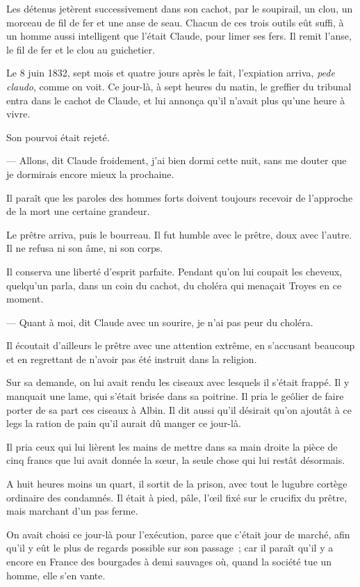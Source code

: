 \documentclass[french,twoside]{book} %
\begin{document}
Les détenus jetèrent successivement dans son cachot, par le soupirail, un clou, un morceau de fil de fer et une anse de seau. Chacun de ces trois outils eût suffi, à un homme aussi intelligent que l’était Claude, pour limer ses fers. Il remit l’anse, le fil de fer et le clou au guichetier.\par
Le 8 juin 1832, sept mois et quatre jours après le fait, l’expiation arriva, \emph{pede claudo}, comme on voit. Ce jour-là, à sept heures du matin, le greffier du tribunal entra dans le cachot de Claude, et lui annonça qu’il n’avait plus qu’une heure à vivre.\par
Son pourvoi était rejeté.\par
— Allons, dit Claude froidement, j’ai bien dormi cette nuit, sans me douter que je dormirais encore mieux la prochaine.\par
Il paraît que les paroles des hommes forts doivent  toujours recevoir de l’approche de la mort une certaine grandeur.\par
Le prêtre arriva, puis le bourreau. Il fut humble avec le prêtre, doux avec l’autre. Il ne refusa ni son âme, ni son corps.\par
Il conserva une liberté d’esprit parfaite. Pendant qu’on lui coupait les cheveux, quelqu’un parla, dans un coin du cachot, du choléra qui menaçait Troyes en ce moment.\par
— Quant à moi, dit Claude avec un sourire, je n’ai pas peur du choléra.\par
Il écoutait d’ailleurs le prêtre avec une attention extrême, en s’accusant beaucoup et en regrettant de n’avoir pas été instruit dans la religion.\par
Sur sa demande, on lui avait rendu les ciseaux avec lesquels il s’était frappé. Il y manquait une lame, qui s’était brisée dans sa poitrine. Il pria le geôlier de faire porter de sa part ces ciseaux à Albin. Il dit aussi qu’il désirait qu’on ajoutât à ce legs la ration de pain qu’il aurait dû manger ce jour-là.\par
Il pria ceux qui lui lièrent les mains de mettre dans sa main droite la pièce de cinq francs que lui avait donnée la sœur, la seule chose qui lui restât désormais.\par
A huit heures moins un quart, il sortit de la prison, avec tout le lugubre cortège ordinaire des condamnés. Il était à pied, pâle, l’œil fixé sur le crucifix du prêtre, mais marchant d’un pas ferme.\par
On avait choisi ce jour-là pour l’exécution, parce que c’était jour de marché, afin qu’il y eût le plus de  regards possible sur son passage ; car il paraît qu’il y a encore en France des bourgades à demi sauvages où, quand la société tue un homme, elle s’en vante.\par
\end{document}
